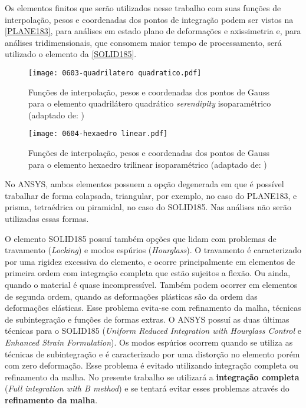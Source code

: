 Os elementos finitos que serão utilizados nesse trabalho com suas funções de interpolação, pesos e coordenadas dos pontos de integração podem ser vistos na \autoref{PLANE183}, para análises em estado plano de deformações e axissimetria e, para análises tridimensionais, que consomem maior tempo de processamento, será utilizado o elemento da \autoref{SOLID185}.
\begin{figure}[H]
	\begin{center}
		\texttt{[image: 0603-quadrilatero quadratico.pdf]}
	\end{center}
	\caption{\label{PLANE183}Funções de interpolação, pesos e coordenadas dos pontos de Gauss para o elemento quadrilátero quadrático \textit{serendipity} isoparamétrico (adaptado de: )}
\end{figure}
\begin{figure}[H]
	\begin{center}
		\texttt{[image: 0604-hexaedro linear.pdf]}
	\end{center}
	\caption{\label{SOLID185}Funções de interpolação, pesos e coordenadas dos pontos de Gauss para o elemento hexaedro trilinear isoparamétrico (adaptado de: )}
\end{figure}

No ANSYS, ambos elementos possuem a opção degenerada em que é possível trabalhar de forma colapsada, triangular, por exemplo, no caso do PLANE183, e prisma, tetraédrica ou piramidal, no caso do SOLID185. Nas análises não serão utilizadas essas formas. 

O elemento SOLID185 possuí também opções que lidam com problemas de travamento (\textit{Locking}) e modos espúrios (\textit{Hourglass}). O travamento é caracterizado por uma rigidez excessiva do elemento, e ocorre principalmente em elementos de primeira ordem com integração completa que estão sujeitos a flexão. Ou ainda, quando o material é quase incompressível. Também podem ocorrer em elementos de segunda ordem, quando as deformações plásticas são da ordem das deformações elásticas. Esse problema evita-se com refinamento da malha, técnicas de subintegração e funções de formas extras. O ANSYS possuí as duas últimas técnicas para o SOLID185 (\textit{Uniform Reduced Integration with Hourglass Control} e \textit{Enhanced Strain Formulation}). Os modos espúrios ocorrem quando se utiliza as técnicas de subintegração e é caracterizado por uma distorção no elemento porém com zero deformação. Esse problema é evitado utilizando integração completa ou refinamento da malha. No presente trabalho se utilizará a \textbf{integração completa} (\textit{Full integration with B method}) e se tentará evitar esses problemas através do \textbf{refinamento da malha}. 

